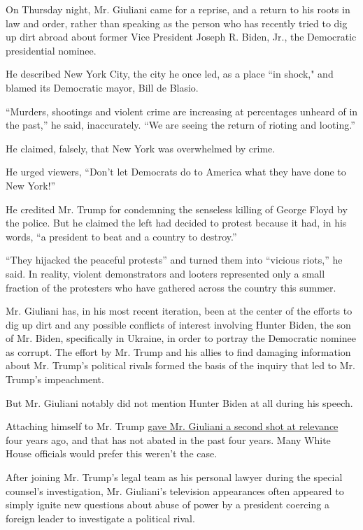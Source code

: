 On Thursday night, Mr. Giuliani came for a reprise, and a return to his
roots in law and order, rather than speaking as the person who has
recently tried to dig up dirt abroad about former Vice President Joseph
R. Biden, Jr., the Democratic presidential nominee.

He described New York City, the city he once led, as a place ``in
shock," and blamed its Democratic mayor, Bill de Blasio.

``Murders, shootings and violent crime are increasing at percentages
unheard of in the past,'' he said, inaccurately. ``We are seeing the
return of rioting and looting.''

He claimed, falsely, that New York was overwhelmed by crime.

He urged viewers, ``Don't let Democrats do to America what they have
done to New York!''

He credited Mr. Trump for condemning the senseless killing of George
Floyd by the police. But he claimed the left had decided to protest
because it had, in his words, ``a president to beat and a country to
destroy.''

``They hijacked the peaceful protests'' and turned them into ``vicious
riots,'' he said. In reality, violent demonstrators and looters
represented only a small fraction of the protesters who have gathered
across the country this summer.

Mr. Giuliani has, in his most recent iteration, been at the center of
the efforts to dig up dirt and any possible conflicts of interest
involving Hunter Biden, the son of Mr. Biden, specifically in Ukraine,
in order to portray the Democratic nominee as corrupt. The effort by Mr.
Trump and his allies to find damaging information about Mr. Trump's
political rivals formed the basis of the inquiry that led to Mr. Trump's
impeachment.

But Mr. Giuliani notably did not mention Hunter Biden at all during his
speech.

Attaching himself to Mr. Trump
\href{https://www.nytimes3xbfgragh.onion/2020/08/27/us/politics/trump-washington-giuliani.html}{gave
Mr. Giuliani a second shot at relevance} four years ago, and that has
not abated in the past four years. Many White House officials would
prefer this weren't the case.

After joining Mr. Trump's legal team as his personal lawyer during the
special counsel's investigation, Mr. Giuliani's television appearances
often appeared to simply ignite new questions about abuse of power by a
president coercing a foreign leader to investigate a political rival.

